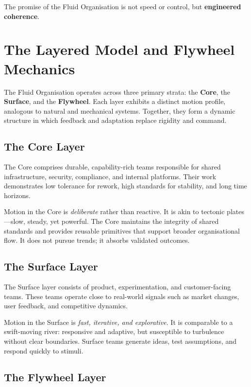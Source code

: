 \documentclass[12pt]{article}
\begin{document}
The promise of the Fluid Organisation is not speed or control, but \textbf{engineered coherence}.


\section{The Layered Model and Flywheel Mechanics}

The Fluid Organisation operates across three primary strata: the \textbf{Core}, the \textbf{Surface}, and the \textbf{Flywheel}. Each layer exhibits a distinct motion profile, analogous to natural and mechanical systems. Together, they form a dynamic structure in which feedback and adaptation replace rigidity and command.

\subsection*{The Core Layer}

The Core comprises durable, capability-rich teams responsible for shared infrastructure, security, compliance, and internal platforms. Their work demonstrates low tolerance for rework, high standards for stability, and long time horizons.

Motion in the Core is \textit{deliberate} rather than reactive. It is akin to tectonic plates—slow, steady, yet powerful. The Core maintains the integrity of shared standards and provides reusable primitives that support broader organisational flow. It does not pursue trends; it absorbs validated outcomes.

\subsection*{The Surface Layer}

The Surface layer consists of product, experimentation, and customer-facing teams. These teams operate close to real-world signals such as market changes, user feedback, and competitive dynamics.

Motion in the Surface is \textit{fast, iterative, and explorative}. It is comparable to a swift-moving river: responsive and adaptive, but susceptible to turbulence without clear boundaries. Surface teams generate ideas, test assumptions, and respond quickly to stimuli.

\subsection*{The Flywheel Layer}
\end{document}
